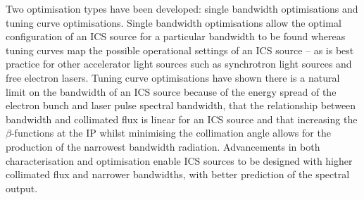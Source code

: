 \documentclass[../main.tex]{subfiles}
\begin{document}
Two optimisation types have been developed: single bandwidth optimisations and tuning curve optimisations. Single bandwidth optimisations allow the optimal configuration of an ICS source for a particular bandwidth to be found whereas tuning curves map the possible operational settings of an ICS source -- as is best practice for other accelerator light sources such as synchrotron light sources and free electron lasers. Tuning curve optimisations have shown there is a natural limit on the bandwidth of an ICS source because of the energy spread of the electron bunch and laser pulse spectral bandwidth, that the relationship between bandwidth and collimated flux is linear for an ICS source and that increasing the $\beta$-functions at the IP whilst minimising the collimation angle allows for the production of the narrowest bandwidth radiation. Advancements in both characterisation and optimisation enable ICS sources to be designed with higher collimated flux and narrower bandwidths, with better prediction of the spectral output. 
\end{document}
